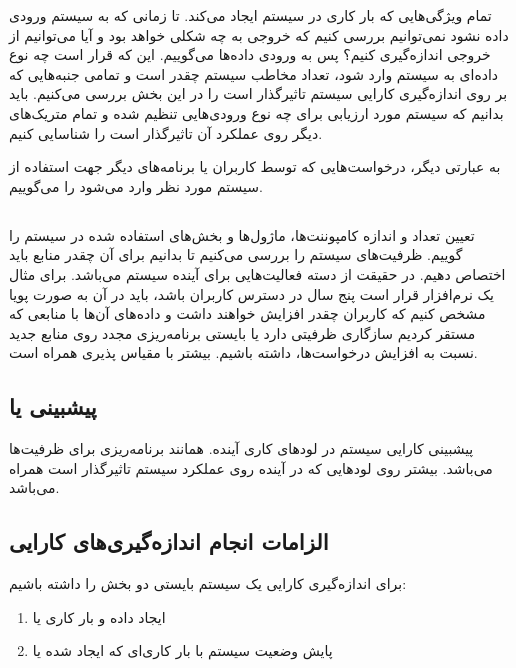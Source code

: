 تمام ویژگی‌هایی که بار کاری در سیستم ایجاد می‌کند. تا زمانی که به سیستم ورودی
داده نشود نمی‌توانیم بررسی کنیم که خروجی به چه شکلی خواهد بود و آیا می‌توانیم از
خروجی اندازه‌گیری کنیم؟ پس به ورودی داده‌ها  می‌گوییم. این که قرار
است چه نوع داده‌ای به سیستم وارد شود، تعداد مخاطب سیستم چقدر است و تمامی
جنبه‌هایی که بر روی اندازه‌گیری کارایی سیستم تاثیرگذار است را در این بخش بررسی
می‌کنیم. باید بدانیم که سیستم مورد ارزیابی برای چه نوع ورودی‌هایی تنظیم شده و
تمام متریک‌های دیگر روی عملکرد آن تاثیرگذار است را شناسایی کنیم.

به عبارتی دیگر، درخواست‌هایی که توسط کاربران یا برنامه‌های دیگر جهت استفاده از
سیستم مورد نظر وارد می‌شود را  می‌گوییم.

\subsection{}

تعیین تعداد و اندازه کامپوننت‌ها، ماژول‌‌ها و بخش‌های استفاده شده در سیستم را
گوییم. ظرفیت‌های سیستم را بررسی می‌کنیم تا بدانیم برای آن چقدر منابع باید اختصاص
دهیم. در حقیقت از دسته فعالیت‌هایی برای آینده سیستم می‌باشد. برای مثال یک
نرم‌افزار قرار است پنج سال در دسترس کاربران باشد، باید در آن به صورت پویا مشخص
کنیم که کاربران چقدر افزایش خواهند داشت و داده‌های آن‌ها با منابعی که مستقر
کردیم سازگاری ظرفیتی دارد یا بایستی برنامه‌ریزی مجدد روی منابع جدید نسبت به
افزایش درخواست‌ها، داشته باشیم. بیشتر با مقیاس پذیری همراه است.

\subsection{پیشبینی یا }

پیشبینی کارایی سیستم در لود‌های کاری آینده. همانند برنامه‌ریزی برای ظرفیت‌ها
می‌باشد. بیشتر روی لود‌هایی که در آینده روی عملکرد سیستم تاثیرگذار است همراه
می‌باشد.

\subsection{الزامات انجام اندازه‌گیری‌های کارایی}

برای اندازه‌گیری کارایی یک سیستم بایستی دو بخش را داشته باشیم:

\begin{enumerate}
    \item ایجاد داده و بار کاری یا 
    \item پایش وضعیت سیستم با بار کاری‌ای که ایجاد شده یا 
\end{enumerate}

